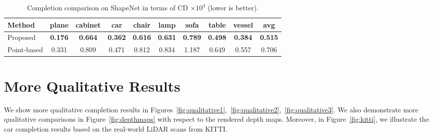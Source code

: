 \documentclass[final]{cvpr}
\begin{document}
\begin{table}[h]
\begin{center}
\footnotesize
\setlength\tabcolsep{1.5pt}
\begin{tabular}{@{}l|cccccccc|c@{}}
\toprule
Method&plane&cabinet&car&chair&lamp&sofa&table&vessel&avg\\
\midrule
Proposed & \textbf{0.176} & \textbf{0.664} & \textbf{0.362} & \textbf{0.616} & \textbf{0.631} & \textbf{0.789} & \textbf{0.498} & \textbf{0.384} & \textbf{0.515} \\
Point-based & 0.331 & 0.809 & 0.471 & 0.812 & 0.834 & 1.187 & 0.649 & 0.557 & 0.706 \\
\bottomrule
\end{tabular}
\end{center}
\caption{Completion comparison on ShapeNet in terms of CD $\times 10^3$ (lower is better).}
\label{table:shapenet_cd}
\end{table}

\section{More Qualitative Results}
We show more qualitative completion results in Figures~\ref{fig:qualitative1},~\ref{fig:qualitative2},~\ref{fig:qualitative3}.
We also demonstrate more qualitative comparisons in Figure~\ref{fig:depthmaps} with respect to the rendered depth maps.
Moreover, in Figure~\ref{fig:kitti}, we illustrate the car completion results based on the real-world LiDAR scans from KITTI.
\end{document}
